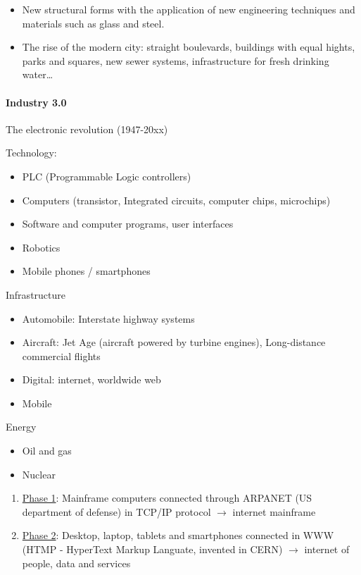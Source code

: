 \vspace{1\baselineskip}

\begin{itemize}
    \item New structural forms with the application of new engineering techniques and
        materials such as glass and steel.
    \item The rise of the modern city: straight boulevards, buildings with equal
        hights, parks and squares, new sewer systems, infrastructure for fresh
        drinking water\dots
\end{itemize}

\paragraph{Industry 3.0} The electronic revolution (1947-20xx)

Technology:
\begin{itemize}
    \item PLC (Programmable Logic controllers)
    \item Computers (transistor, Integrated circuits, computer chips, microchips)
    \item Software and computer programs, user interfaces
    \item Robotics
    \item Mobile phones / smartphones
\end{itemize}
Infrastructure
\begin{itemize}
    \item Automobile: Interstate highway systems
    \item Aircraft: Jet Age (aircraft powered by turbine engines),
        Long-distance commercial flights
    \item Digital: internet, worldwide web
    \item Mobile
\end{itemize}
Energy
\begin{itemize}
    \item Oil and gas
    \item Nuclear
\end{itemize}

\begin{enumerate}[]
    \item \underline{Phase 1}: Mainframe computers connected through ARPANET
        (US department of defense) in TCP/IP protocol $\rightarrow$ internet
        mainframe
    \item \underline{Phase 2}: Desktop, laptop, tablets and smartphones connected
        in WWW (HTMP - HyperText Markup Languate, invented in CERN) $\rightarrow$
        internet of people, data and services
\end{enumerate}

